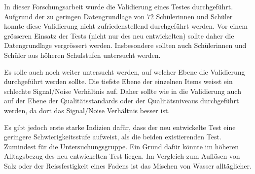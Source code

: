 

In dieser Forschungsarbeit wurde die Validierung eines Testes durchgeführt. Aufgrund der zu geringen Datengrundlage von 72 Schülerinnen und Schüler konnte diese Validierung nicht zufriedenstellend durchgeführt werden. Vor einem grösseren Einsatz der Tests (nicht nur des neu entwickelten) sollte daher die Datengrundlage vergrössert werden. Insbesondere sollten auch Schülerinnen und Schüler aus höheren Schulstufen untersucht werden.

Es solle auch noch weiter untersucht werden, auf welcher Ebene die Validierung durchgeführt werden sollte. Die tiefste Ebene der einzelnen Items weisst ein schlechte Signal/Noise Verhältnis auf. Daher sollte wie in \citet{Sichau2015a} die Validierung auch auf der Ebene der Qualitätsstandards oder der Qualitätsniveaus durchgeführt werden, da dort das Signal/Noise Verhältnis besser ist.

Es gibt jedoch erste starke Indizien dafür, dass der neu entwickelte Test eine geringere Schwierigkeitsstufe aufweist, als die beiden existierenden Test. Zumindest für die Untersuchungsgruppe. Ein Grund dafür könnte im höheren Alltagsbezug des neu entwickelten Test liegen. Im Vergleich zum Auflösen von Salz oder der Reissfestigkeit eines Fadens ist das Mischen von Wasser alltäglicher.